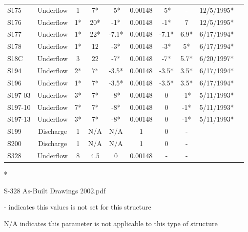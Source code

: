 \begin{table}[h]
\begin{tabular}{@{}lccccccccc@{}}
{S175}          & Underflow     & 1        & 7*          & -5*          & 0.00148     & -5*             & -       & 12/5/1995*      \\
{S176}          & Underflow     & 1*       & 20*         & -1*          & 0.00148     & -1*             & 7       & 12/5/1995*      \\
{S177}          & Underflow     & 1*       & 22*         & -7.1*        & 0.00148     &   -7.1*         & 6.9*    & 6/17/1994*      \\
{S178}          & Underflow     & 1*       & 12          & -3*          & 0.00148     & -3*             & 5*      & 6/17/1994*      \\
{S18C}          & Underflow     & 3        & 22          & -7*          & 0.00148     & -7*             & 5.7*    & 6/20/1997*      \\
{S194}          & Underflow     & 2*       & 7*          & -3.5*        & 0.00148     & -3.5*           & 3.5*    & 6/17/1994*      \\
{S196}          & Underflow     & 1*       & 7*          & -3.5*        & 0.00148     & -3.5*           & 3.5*    & 6/17/1994*      \\
{S197-03}       & Underflow     & 3*       & 7*          & -8*          & 0.00148     & 0               & -1*     & 5/11/1993*      \\
{S197-10}       & Underflow     & 7*       & 7*          & -8*          & 0.00148     & 0               & -1*     & 5/11/1993*      \\
{S197-13}       & Underflow     & 3*       & 7*          & -8*          & 0.00148     & 0               & -1*     & 5/11/1993*      \\
{S199}          & Discharge     & 1        & N/A         & N/A          & 1           & 0               & -       &                 \\
{S200}          & Discharge     & 1        & N/A         & N/A          & 1           & 0               & -       &                 \\
{S328}          & Underflow     & 8        & 4.5         & 0            & 0.00148     & -               & -       &                 \\
\hline
\end{tabular}

* \cite{corp2005}

S-328 As-Built Drawings 2002.pdf

- indicates this values is not set for this structure

N/A indicates this parameter is not applicable to this type of structure
\end{table}
\normalsize


